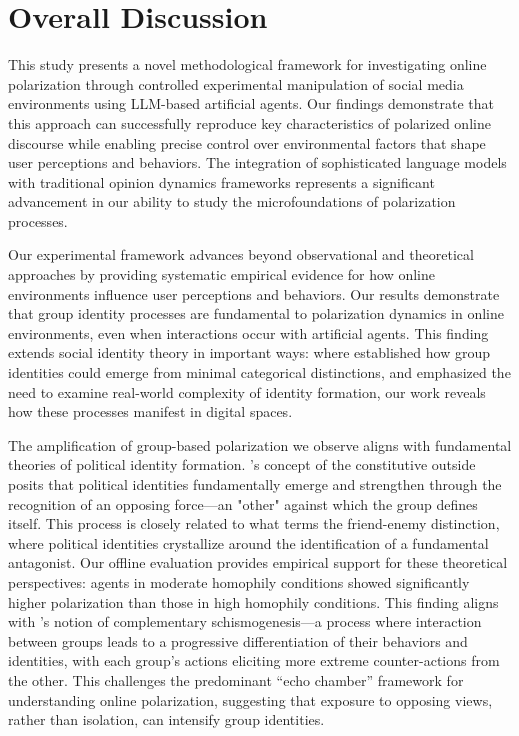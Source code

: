 \section{Overall Discussion}

This study presents a novel methodological framework for investigating online polarization through controlled experimental manipulation of social media environments using LLM-based artificial agents. Our findings demonstrate that this approach can successfully reproduce key characteristics of polarized online discourse while enabling precise control over environmental factors that shape user perceptions and behaviors. The integration of sophisticated language models with traditional opinion dynamics frameworks represents a significant advancement in our ability to study the microfoundations of polarization processes.

Our experimental framework advances beyond observational and theoretical approaches by providing systematic empirical evidence for how online environments influence user perceptions and behaviors. Our results demonstrate that group identity processes are fundamental to polarization dynamics in online environments, even when interactions occur with artificial agents. This finding extends social identity theory in important ways: where \citep{tajfel_integrative_1979} established how group identities could emerge from minimal categorical distinctions, and \citep{huddy_social_2001} emphasized the need to examine real-world complexity of identity formation, our work reveals how these processes manifest in digital spaces.

The amplification of group-based polarization we observe aligns with fundamental theories of political identity formation. \citep{laclau_hegemony_2014}'s concept of the constitutive outside posits that political identities fundamentally emerge and strengthen through the recognition of an opposing force---an "other" against which the group defines itself. This process is closely related to what \citep{schmitt_concept_2008} terms the friend-enemy distinction, where political identities crystallize around the identification of a fundamental antagonist. Our offline evaluation provides empirical support for these theoretical perspectives: agents in moderate homophily conditions showed significantly higher polarization than those in high homophily conditions. This finding aligns with \citep{bateson_naven_1958}'s notion of complementary schismogenesis---a process where interaction between groups leads to a progressive differentiation of their behaviors and identities, with each group's actions eliciting more extreme counter-actions from the other. This challenges the predominant ``echo chamber'' framework \citep{bakshy_exposure_2015} for understanding online polarization, suggesting that exposure to opposing views, rather than isolation, can intensify group identities.

